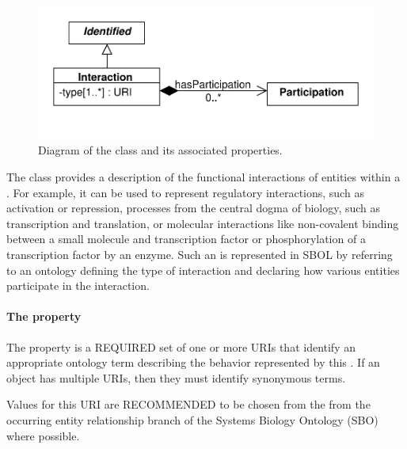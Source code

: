 \begin{figure}[ht]
\begin{center}
\includegraphics[scale=0.6]{uml/interaction}
\caption[]{Diagram of the  class and its associated properties.}
\label{uml:interaction}
\end{center}
\end{figure}

The  class provides a description of the functional interactions of entities within a .
For example, it can be used to represent regulatory interactions, such as activation or repression, processes from the central dogma of biology, such as transcription and translation, or molecular interactions like  non-covalent binding between a small molecule and transcription factor or phosphorylation of a transcription factor by an enzyme.
Such an  is represented in SBOL by referring to an ontology defining the type of interaction and declaring how various entities participate in the interaction.

\paragraph{The  property}\label{sec:types}

The  property is a REQUIRED set of one or more URIs that identify an appropriate ontology term describing the behavior represented by this . 
If an  object has multiple
 URIs, then they must identify synonymous terms.

Values for this URI are RECOMMENDED to be chosen from the from the occurring entity relationship branch of the Systems Biology Ontology (SBO) where possible.


